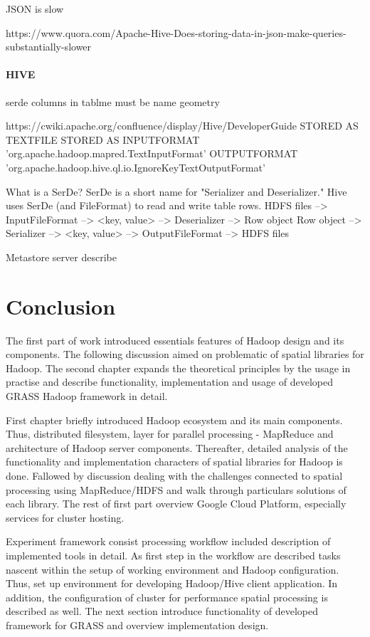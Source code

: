\documentclass[a4paper,12pt,oneside]{report}
\begin{document}
	JSON is slow 
	
	https://www.quora.com/Apache-Hive-Does-storing-data-in-json-make-queries-substantially-slower
	
	\paragraph{HIVE}
	serde
	columns in tablme must be name geometry
	
	
	https://cwiki.apache.org/confluence/display/Hive/DeveloperGuide
	STORED AS TEXTFILE	
	STORED AS INPUTFORMAT
	'org.apache.hadoop.mapred.TextInputFormat'
	OUTPUTFORMAT
	'org.apache.hadoop.hive.ql.io.IgnoreKeyTextOutputFormat'
	
	
	What is a SerDe?
	SerDe is a short name for "Serializer and Deserializer."
	Hive uses SerDe (and FileFormat) to read and write table rows.
	HDFS files --> InputFileFormat --> <key, value> --> Deserializer --> Row object
	Row object --> Serializer --> <key, value> --> OutputFileFormat --> HDFS files
	
	
	Metastore server describe
	
	
	
	\section{Conclusion}
	
	The first part of work introduced essentials features of Hadoop design and its
	components. The following discussion aimed on problematic of spatial libraries
	for Hadoop. The second chapter expands the theoretical principles by the usage
	in practise and describe functionality, implementation and usage of  developed
	GRASS Hadoop framework in detail.
	
	First chapter briefly introduced Hadoop ecosystem and its main components. Thus,
	distributed filesystem, layer for parallel processing - MapReduce and
	architecture of Hadoop server components. Thereafter, detailed analysis of the
	functionality and implementation characters of spatial libraries for Hadoop is
	done. Fallowed by discussion dealing with the challenges connected to spatial
	processing using MapReduce/HDFS and walk through particulars solutions of each
	library. The rest of first part overview  Google Cloud Platform, especially services for cluster hosting.
	
	Experiment framework consist processing workflow included description of implemented tools in detail. As first step in the workflow are described tasks nascent within the setup of working environment and Hadoop configuration. Thus, 
	set up environment for developing Hadoop/Hive client application. In addition, 
	the configuration of  cluster for performance spatial processing is described as well. The next section introduce functionality of developed 
	framework for GRASS and overview implementation design.  
	
\end{document}
